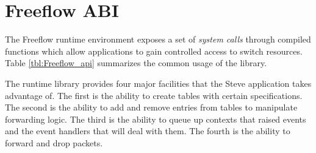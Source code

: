 

\section{Freeflow ABI} \label{fp:dp_interface}

The Freeflow runtime environment exposes a set of \emph{system calls} through compiled functions which allow applications to gain controlled access to switch resources. Table \ref{tbl:Freeflow_api} summarizes the common usage of the library.

The runtime library provides four major facilities that the Steve application takes advantage of. The first is the ability to create tables with certain specifications. The second is the ability to add and remove entries from tables to manipulate forwarding logic. The third is the ability to queue up contexts that raised events and the event handlers that will deal with them. The fourth is the ability to forward and drop packets.

